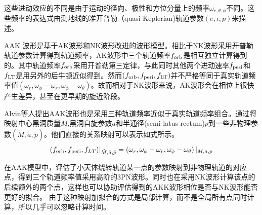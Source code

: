 这些进动效应的不同是由于运动的径向、极性和方位分量上的频率$\omega_{r,\theta,\phi}$不同。这些频率的表达式由测地线的准开普勒（quasi-Keplerian)轨道参数$\left( e,\iota,p \right)$来描述\cite{Schmidt}。

AAK 波形是基于AK波形和NK波形改进的波形模型。相比于NK波形采用开普勒轨道参数计算得到轨道频率，AK波形中三个轨道频率$f_{\rm orb}$是相互独立计算得到的。其中轨道频率$f_{\rm orb}$采用开普勒第三定律，与此同时其他两个进动速率$f_{\rm pesi}$和$f_{\rm LT}$是用另外的后牛顿近似得到。然而$\left( f_{\rm orb},f_{\rm peri},f_{\rm LT} \right)$并不严格等同于真实轨道频率值$\left( \omega_r,\omega_{\phi}-\omega_{r},\omega_\phi-\omega_\theta \right)$。故而相对于NK波形来说，AK波形会在相位上很快产生差异，甚至在更早期的旋近阶段。

Alvin等人提出AAK波形也是采用三种轨道频率近似于真实轨道频率组合。通过将映射中心黑洞质量$M$,黑洞自旋参数$a$和半通径(semi-latus rectum)$p$到一些非物理参数$\left( \tilde{M},\tilde{a},\tilde{p} \right)$。他们直接的关系映射可以表示如式所示。
\begin{equation}
(f_{\rm orb},f_{\rm peri},f_{LT})|_{\tilde{M},\tilde{a},\tilde{p}} =\left( \omega_r,\omega_{\phi}-\omega_{r},\omega_\phi-\omega_\theta \right)|_{M,a,p}
\end{equation}

在AAK模型中，评估了小天体绕转轨道某一点的参数映射到非物理轨道的对应点，得到三个轨道频率值采用高阶的3PN波形。同时也在采用NK波形计算该点的后续额外的两个点，这样也可以协助评估得到的AKK波形相位是否与NK波形能否更好的拟合。
由于这种映射加拟合的方式是局部计算，而不是全局所有点同时计算，所以几乎可以忽略计算时间。



